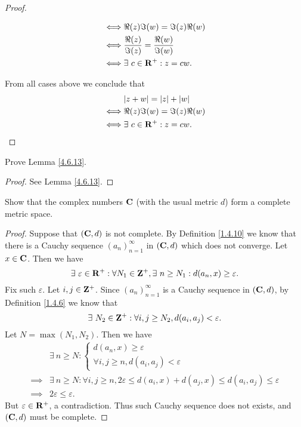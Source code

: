 \begin{proof}
\begin{itemize}
\begin{align*}
                  \iff & \Re(z) \Im(w) = \Im(z) \Re(w)                 \\
                  \iff & \frac{\Re(z)}{\Im(z)} = \frac{\Re(w)}{\Im(w)} \\
                  \iff & \exists\ c \in \mathbf{R}^+ : z = cw.
              \end{align*}
    \end{itemize}
    From all cases above we conclude that
    \begin{align*}
             & \abs{z + w} = \abs{z} + \abs{w} \\
        \iff & \Re(z) \Im(w) = \Im(z) \Re(w)   \\
        \iff & \exists\ c \in \R^+ : z = cw.
    \end{align*}
\end{proof}

\begin{exercise}\label{ex 4.6.9}
    Prove Lemma \ref{4.6.13}.
\end{exercise}

\begin{proof}
    See Lemma \ref{4.6.13}.
\end{proof}

\begin{exercise}\label{ex 4.6.10}
    Show that the complex numbers \(\mathbf{C}\) (with the usual metric \(d\)) form a complete metric space.
\end{exercise}

\begin{proof}
    Suppose that \((\mathbf{C}, d)\) is not complete.
    By Definition \ref{1.4.10} we know that there is a Cauchy sequence \((a_n)_{n = 1}^\infty\) in \((\mathbf{C}, d)\) which does not converge.
    Let \(x \in \mathbf{C}\).
    Then we have
    \[
        \exists\ \varepsilon \in \mathbf{R}^+ : \forall N_1 \in \mathbf{Z}^+, \exists\ n \geq N_1 : d(a_n, x) \geq \varepsilon.
    \]
    Fix such \(\varepsilon\).
    Let \(i, j \in \mathbf{Z}^+\).
    Since \((a_n)_{n = 1}^\infty\) is a Cauchy sequence in \((\mathbf{C}, d)\), by Definition \ref{1.4.6} we know that
    \[
        \exists\ N_2 \in \mathbf{Z}^+ : \forall i, j \geq N_2, d(a_i, a_j) < \varepsilon.
    \]
    Let \(N = \max(N_1, N_2)\).
    Then we have
    \begin{align*}
                 & \exists\ n \geq N : \begin{cases}
                                           d(a_n, x) \geq \varepsilon \\
                                           \forall i, j \geq n, d(a_i, a_j) < \varepsilon
                                       \end{cases}                                                  \\
        \implies & \exists\ n \geq N : \forall i, j \geq n, 2\varepsilon \leq d(a_i, x) + d(a_j, x) \leq d(a_i, a_j) \leq \varepsilon \\
        \implies & 2\varepsilon \leq \varepsilon.
    \end{align*}
    But \(\varepsilon \in \mathbf{R}^+\), a contradiction.
    Thus such Cauchy sequence does not exists, and \((\mathbf{C}, d)\) must be complete.
\end{proof}

